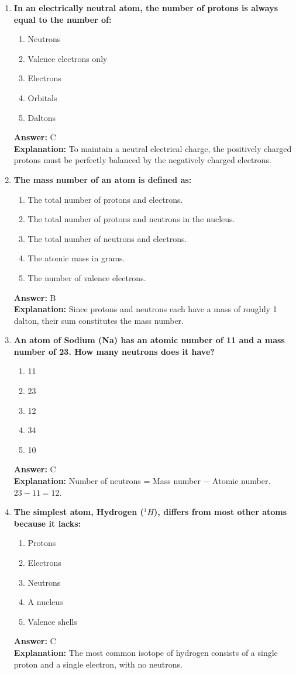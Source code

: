 \documentclass[11pt, a4paper]{article}
\begin{document}
\begin{enumerate}
\item \textbf{In an electrically neutral atom, the number of protons is always equal to the number of:}
\begin{enumerate}[label=\Alph*.]
    \item Neutrons
    \item Valence electrons only
    \item Electrons
    \item Orbitals
    \item Daltons
\end{enumerate}
\textbf{Answer:} C \\
\textbf{Explanation:} To maintain a neutral electrical charge, the positively charged protons must be perfectly balanced by the negatively charged electrons.

\item \textbf{The mass number of an atom is defined as:}
\begin{enumerate}[label=\Alph*.]
    \item The total number of protons and electrons.
    \item The total number of protons and neutrons in the nucleus.
    \item The total number of neutrons and electrons.
    \item The atomic mass in grams.
    \item The number of valence electrons.
\end{enumerate}
\textbf{Answer:} B \\
\textbf{Explanation:} Since protons and neutrons each have a mass of roughly 1 dalton, their sum constitutes the mass number.

\item \textbf{An atom of Sodium (Na) has an atomic number of 11 and a mass number of 23. How many neutrons does it have?}
\begin{enumerate}[label=\Alph*.]
    \item 11
    \item 23
    \item 12
    \item 34
    \item 10
\end{enumerate}
\textbf{Answer:} C \\
\textbf{Explanation:} Number of neutrons = Mass number $-$ Atomic number. $23 - 11 = 12$.

\item \textbf{The simplest atom, Hydrogen ($^1H$), differs from most other atoms because it lacks:}
\begin{enumerate}[label=\Alph*.]
    \item Protons
    \item Electrons
    \item Neutrons
    \item A nucleus
    \item Valence shells
\end{enumerate}
\textbf{Answer:} C \\
\textbf{Explanation:} The most common isotope of hydrogen consists of a single proton and a single electron, with no neutrons.


\end{enumerate}
\end{document}
